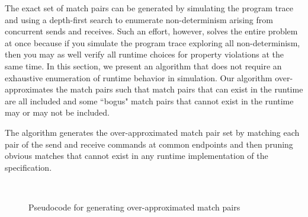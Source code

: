 The exact set of match pairs can be generated by simulating the
program trace and using a depth-first search to enumerate
non-determinism arising from concurrent sends and receives. Such an
effort, however, solves the entire problem at once because if you
simulate the program trace exploring all non-determinism, then you may
as well verify all runtime choices for property violations at the same
time. In this section, we present an algorithm that does not require
an exhaustive enumeration of runtime behavior in simulation. Our
algorithm over-approximates the match pairs such that match pairs that
can exist in the runtime are all included and some ``bogus" match
pairs that cannot exist in the runtime may or may not be included.


The algorithm generates the over-approximated match pair set by
matching each pair of the send and receive commands at common
endpoints and then pruning obvious matches that cannot exist in any
runtime implementation of the specification.

\begin{figure}[h]
\setlength{\tabcolsep}{20pt}
\begin{center}
\scalebox{0.7}{\usebox{\boxalgorithm}}\\
\end{center}
\caption{Pseudocode for generating over-approximated match pairs}
\label{fig:pseudocode}
\end{figure}

